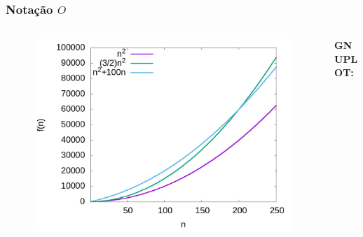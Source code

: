 \documentclass[aspectratio=169]{beamer}
\begin{document}
\begin{frame}[fragile]\frametitle{Notação $O$}
\vspace{-5mm}
\begin{columns}[T]
\begin{column}{0.5\linewidth}
\begin{figure}[h]
	\centering
	\includegraphics[height=0.65\paperheight]{graficos/grafico2.jpg}
\end{figure}
\end{column}
\begin{column}{0.5\linewidth}
\vspace{5mm}
{\fontsize{0}{4}\selectfont{}\textbf{GNUPLOT:}

}
\end{column}
\end{columns}
\end{frame}
\end{document}
